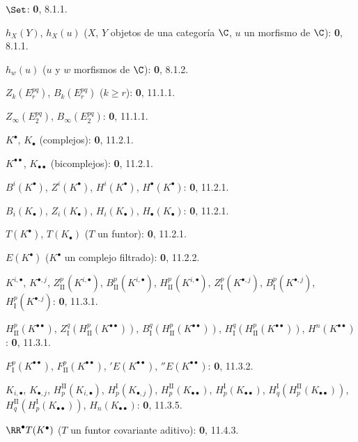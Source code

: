 \documentclass[oneside]{amsart}
\renewcommand{\geq}{\geqslant}
\begin{document}
\begin{flushleft}
$\Set$: \textbf 0, 8.1.1.

$h_X(Y)$, $h_X(u)$ ($X$, $Y$ objetos de una categoría $\C$, $u$ un morfismo
de $\C$): \textbf 0, 8.1.1.

$h_w(u)$ ($u$ y $w$ morfismos de $\C$): \textbf 0, 8.1.2.

$Z_k(E_r^{pq})$, $B_k(E_r^{pq})$ ($k\geq r$): \textbf 0, 11.1.1.

$Z_\infty(E_2^{pq})$, $B_\infty(E_2^{pq})$: \textbf 0, 11.1.1.

$K^\bullet$, $K_\bullet$ (complejos): \textbf 0, 11.2.1.

$K^{\bullet\bullet}$, $K_{\bullet\bullet}$ (bicomplejos): \textbf 0, 11.2.1.

$B^i(K^\bullet)$, $Z^i(K^\bullet)$, $H^i(K^\bullet)$,
$H^\bullet(K^\bullet)$: \textbf 0, 11.2.1.

$B_i(K_\bullet)$, $Z_i(K_\bullet)$, $H_i(K_\bullet)$,
$H_\bullet(K_\bullet)$: \textbf 0, 11.2.1.

$T(K^\bullet)$, $T(K_\bullet)$ ($T$ un funtor): \textbf 0, 11.2.1.

$E(K^\bullet)$ ($K^\bullet$ un complejo filtrado): \textbf 0, 11.2.2.

$K^{i,\bullet}$, $K^{\bullet,j}$, $Z_{\mathrm{II}}^p(K^{i,\bullet})$,
$B_{\mathrm{II}}^p(K^{i,\bullet})$, $H_{\mathrm{II}}^p(K^{i,\bullet})$,
$Z_{\mathrm I}^p(K^{\bullet,j})$, $B_{\mathrm I}^p(K^{\bullet,j})$,
$H_{\mathrm I}^p(K^{\bullet,j})$: \textbf 0, 11.3.1.

$H_{\mathrm{II}}^p(K^{\bullet\bullet})$,
$Z_{\mathrm I}^q(H_{\mathrm{II}}^p(K^{\bullet\bullet}))$,
$B_{\mathrm I}^q(H_{\mathrm{II}}^p(K^{\bullet\bullet}))$,
$H_{\mathrm I}^q(H_{\mathrm{II}}^p(K^{\bullet\bullet}))$,
$H^n(K^{\bullet\bullet})$: \textbf 0, 11.3.1.

$F_{\mathrm I}^p(K^{\bullet\bullet})$,
$F_{\mathrm{II}}^p(K^{\bullet\bullet})$, ${}'E(K^{\bullet\bullet})$,
${}''E(K^{\bullet\bullet})$: \textbf 0, 11.3.2.

$K_{i,\bullet}$, $K_{\bullet,j}$, $H_p^{\mathrm{II}}(K_{i,\bullet})$,
$H_p^{\mathrm I}(K_{\bullet,j})$, $H_p^{\mathrm{II}}(K_{\bullet\bullet})$,
$H_p^{\mathrm I}(K_{\bullet\bullet})$,
$H_q^{\mathrm I}(H_p^{\mathrm{II}}(K_{\bullet\bullet}))$,
$H_q^{\mathrm{II}}(H_p^{\mathrm I}(K_{\bullet\bullet}))$,
$H_n(K_{\bullet\bullet})$: \textbf 0, 11.3.5.

$\RR^\bullet T(K^\bullet)$ ($T$ un funtor covariante aditivo): \textbf 0, 11.4.3.


\end{flushleft}
\end{document}
